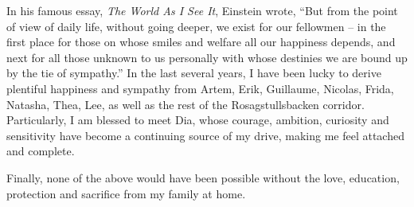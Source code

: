 \begin{acknowledgements}
  In his famous essay, \emph{The World As I See It}, Einstein wrote,
  ``But from the point of view of daily life, without going deeper, we exist for our fellowmen --
  in the first place for those on whose smiles and welfare all our happiness depends,
  and next for all those unknown to us personally with whose destinies we are bound up by the tie of sympathy.''
  In the last several years, I have been lucky to derive plentiful happiness and sympathy from Artem, Erik, Guillaume, Nicolas, Frida, Natasha, Thea, Lee,
  as well as the rest of the Rosagstullsbacken corridor.
  Particularly, I am blessed to meet Dia, whose courage, ambition, curiosity and sensitivity have become a continuing source of my drive,
  making me feel attached and complete.
  
  Finally, none of the above would have been possible without the love, education, protection and sacrifice from my family at home.
  
  
\end{acknowledgements}
